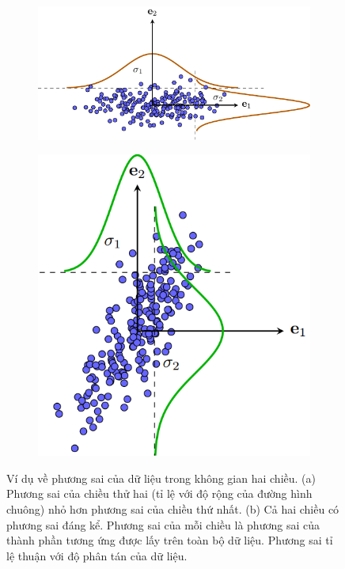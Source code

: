 \documentclass[12pt,a4paper,oneside]{report}
\numberwithin{equation}{section}
\begin{document}
 \begin{figure}[t]
	\begin{subfigure}{0.59\textwidth}
		\includegraphics[width=0.99\linewidth]{pca_diagvar.pdf}
		\caption{}
		\label{fig:pca_2a}
	\end{subfigure}
	\begin{subfigure}{0.33\textwidth}
		\includegraphics[width=0.99\linewidth]{pca_var.png}
		\caption{}
		\label{fig:pca_2b}
	\end{subfigure}
	\caption{Ví dụ về phương sai của dữ liệu trong không gian hai chiều. (a)
		Phương sai của chiều thử hai (tỉ lệ với độ rộng của đường hình chuông) nhỏ
		hơn phương sai của chiều thứ nhất. (b) Cả hai chiều có phương sai đáng kể. Phương sai của
		mỗi chiều là phương sai của thành phần tương ứng được lấy trên toàn bộ dữ
		liệu. Phương sai tỉ lệ thuận với độ phân tán của dữ liệu.}
	\label{fig:pca_2}
\end{figure}
\end{document}
